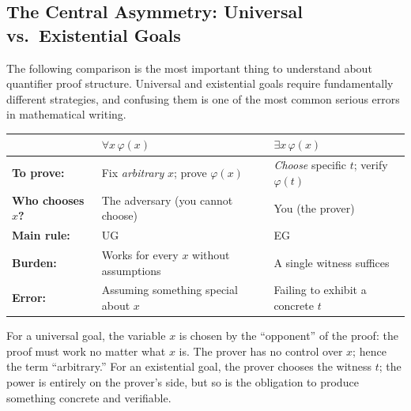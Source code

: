 
\subsection*{The Central Asymmetry: Universal vs.\ Existential Goals}

\begin{exposition}
The following comparison is the most important thing to understand about
quantifier proof structure. Universal and existential goals require fundamentally
different strategies, and confusing them is one of the most common serious errors
in mathematical writing.
\end{exposition}

\begin{tcolorbox}[colback=gray!6, colframe=gray!40, arc=2pt,
  left=6pt, right=6pt, top=4pt, bottom=4pt,
  title={\small\textbf{Universal vs.\ Existential Goals: The Fundamental Difference}},
  fonttitle=\small\bfseries]
\small
\begin{tabular}{l l l}
\toprule
 & \textbf{$\forall x\,\varphi(x)$} & \textbf{$\exists x\,\varphi(x)$} \\
\midrule
\textbf{To prove:} & Fix \emph{arbitrary} $x$; prove $\varphi(x)$ & \emph{Choose} specific $t$; verify $\varphi(t)$ \\
\textbf{Who chooses $x$?} & The adversary (you cannot choose) & You (the prover) \\
\textbf{Main rule:} & UG & EG \\
\textbf{Burden:} & Works for every $x$ without assumptions & A single witness suffices \\
\textbf{Error:} & Assuming something special about $x$ & Failing to exhibit a concrete $t$ \\
\bottomrule
\end{tabular}
\end{tcolorbox}

\begin{remark*}
For a universal goal, the variable $x$ is chosen by the ``opponent'' of the
proof: the proof must work no matter what $x$ is. The prover has no control
over $x$; hence the term ``arbitrary.'' For an existential goal, the prover
chooses the witness $t$; the power is entirely on the prover's side, but so is
the obligation to produce something concrete and verifiable.
\end{remark*}

